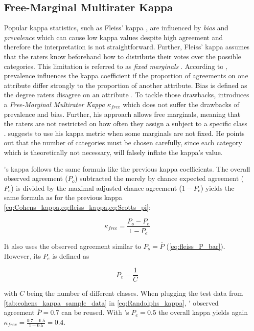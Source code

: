 \subsection{Free-Marginal Multirater Kappa}
\label{chp:fundamentals:sec:inter_rater_agreement:subsec:free_marginal_multirater_kappa}

Popular kappa statistics, such as Fleiss' kappa \parencite{Fleiss:1971}, are influenced by \textit{bias} and \textit{prevalence} which can cause low kappa values despite high agreement \parencite{Randolph:2005, Sim:2005} and therefore the interpretation is not straightforward.
Further, Fleiss' kappa assumes that the raters know beforehand how to distribute their votes over the possible categories.
This limitation is referred to as \textit{fixed marginals} \parencite{Brennan:1981}.
According to \textcite{Sim:2005}, prevalence influences the kappa coefficient if the proportion of agreements on one attribute differ strongly to the proportion of another attribute.
Bias is defined as the degree raters disagree on an attribute \parencite{Sim:2005}.
To tackle those drawbacks, \textcite{Randolph:2005} introduces a \textit{Free-Marginal Multirater Kappa} $\kappa_{free}$ which does not suffer the drawbacks of prevalence and bias.
Further, his approach allows free marginals, meaning that the raters are not restricted on how often they assign a subject to a specific class \parencite{Brennan:1981}.
\citeauthor{Randolph:2005} suggests to use his kappa metric when some marginals are not fixed.
He points out that the number of categories must be chosen carefully, since each category which is theoretically not necessary, will falsely inflate the kappa's value.

's kappa \parencite{Randolph:2005} follows the same formula like the previous kappa coefficients.
The overall observed agreement ($P_o$) subtracted the merely by chance expected agreement ($P_e$) is divided by the maximal adjusted chance agreement ($1-P_e$) yields the same formula as for the previous kappa \cref{eq:Cohens_kappa,eq:fleiss_kappa,eq:Scotts_pi}:

\begin{equation}\label{eq:Randolphs_kappa}
    \kappa_{free} = \frac{P_o - P_e}{1 - P_e}
\end{equation}

It also uses the observed agreement similar to \citeauthor{Fleiss:1971}  $P_o=\bar{P}$ (\cref{eq:fleiss_P_bar}).
However, its $P_e$ is defined as

\begin{equation}\label{eq:Randolphs_Pe}
P_e = \frac{1}{C}
\end{equation}

with $C$ being the number of different classes.
When plugging the test data from \cref{tab:cohens_kappa_sample_data} in \cref{eq:Randolphs_kappa}, \citeauthor{Fleiss:1971}' observed agreement $\bar{P} = 0.7$ can be reused.
With \citeauthor{Randolph:2005}'s $P_e = 0.5$ the overall kappa yields again $\kappa_{free} = \frac{0.7 - 0.5}{1 - 0.5} = 0.4$.
